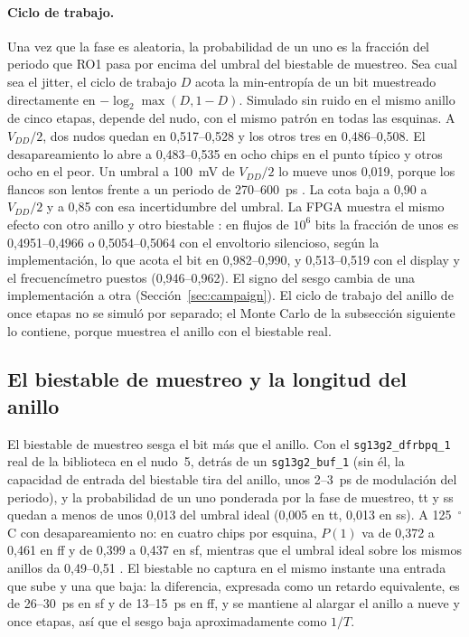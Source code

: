 \paragraph{Ciclo de trabajo.} Una vez que la fase es aleatoria, la
probabilidad de un uno es la fracción del periodo que RO1 pasa por encima
del umbral del biestable de muestreo. Sea cual sea el jitter, el ciclo de
trabajo $D$ acota la min-entropía de un bit muestreado directamente en
$-\log_2 \max(D, 1-D)$. Simulado sin ruido en el mismo anillo de cinco
etapas, depende del nudo, con el mismo patrón en todas las esquinas. A
$V_{DD}/2$, dos nudos quedan en 0,517--0,528 y los otros tres en
0,486--0,508. El desapareamiento lo abre a 0,483--0,535 en ocho chips en
el punto típico y otros ocho en el peor. Un umbral a 100~mV de $V_{DD}/2$
lo mueve unos 0,019, porque los flancos son lentos frente a un periodo de
270--600~ps \simu{}. La cota baja a 0,90 a $V_{DD}/2$ y a 0,85 con esa
incertidumbre del umbral. La \ac{FPGA} muestra el mismo efecto con otro
anillo y otro biestable \meas{}: en flujos de $10^6$ bits la fracción de
unos es 0,4951--0,4966 o 0,5054--0,5064 con el envoltorio silencioso,
según la implementación, lo que acota el bit en 0,982--0,990, y
0,513--0,519 con el display y el frecuencímetro puestos (0,946--0,962). El
signo del sesgo cambia de una implementación a otra
(Sección~\ref{sec:campaign}). El ciclo de trabajo del anillo de once
etapas no se simuló por separado; el Monte Carlo de la subsección
siguiente lo contiene, porque muestrea el anillo con el biestable real.

\subsection{El biestable de muestreo y la longitud del anillo}
\label{sec:ff_mc}

El biestable de muestreo sesga el bit más que el anillo. Con el
\texttt{sg13g2\_\allowbreak dfrbpq\_1} real de la biblioteca en el nudo~5, detrás de
un \texttt{sg13g2\_\allowbreak buf\_1} (sin él, la capacidad de entrada del biestable
tira del anillo, unos 2--3~ps de modulación del periodo), y la
probabilidad de un uno ponderada por la fase de muestreo, tt y ss quedan a
menos de unos 0,013 del umbral ideal (0,005 en tt, 0,013 en ss). A 125~$^\circ$C con desapareamiento no:
en cuatro chips por esquina, $P(1)$ va de 0,372 a 0,461 en ff y de 0,399 a
0,437 en sf, mientras que el umbral ideal sobre los mismos anillos da
0,49--0,51 \simu{}. El biestable no captura en el mismo instante
una entrada que sube y una que baja: la diferencia, expresada como un
retardo equivalente, es de 26--30~ps en sf y de 13--15~ps en ff, y se
mantiene al alargar el anillo a nueve y once etapas, así que el sesgo
baja aproximadamente como $1/T$.

